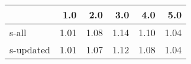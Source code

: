 \begin{tabular}{lrrrrr}
\toprule
{} &  1.0 &  2.0 &  3.0 &  4.0 &  5.0 \\
\midrule
s-all     & 1.01 & 1.08 & 1.14 & 1.10 & 1.04 \\
s-updated & 1.01 & 1.07 & 1.12 & 1.08 & 1.04 \\
\bottomrule
\end{tabular}
